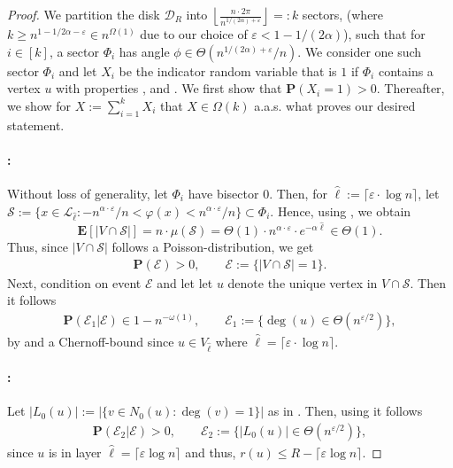 \documentclass[letterpaper,11pt]{article}
\newcommand{\E}[1]{\mathbf{E}\left[#1\right]}
\newcommand{\Prob}[1]{\mathbf{P}\left(#1\right)}
\newcommand{\eps}{\varepsilon}
\newcommand{\aas}{a.a.s.\xspace}
\newcommand{\disk}{\ensuremath{\mathcal D_R}\xspace}
\newcommand{\1}{\mathbb I}
\newcommand{\Layer}[1]{\mathcal{L}_{#1}}
\begin{document}
\begin{proof}
    We partition the disk $\disk$ into $\left\lfloor\frac{n\cdot 2\pi}{n^{1/(2\alpha) + \eps}} \right\rfloor =:  k$ sectors, (where $k \geq n^{1 - 1/2\alpha -\eps}\in n^{\Omega(1)}$ due to our choice of $\eps < 1 - 1/(2\alpha)$), such that for $i \in [k]$, a sector $\Phi_i$ has angle $\phi \in \Theta(n^{1/(2\alpha) + \eps}/n)$. We consider one such sector $\Phi_i$ and let $X_i$ be the indicator random variable that is $1$ if $\Phi_i$ contains a vertex $u$ with properties ,  and . We first show that $\Prob{X_i =1} >0$. Thereafter, we show for $X:= \sum_{i=1}^k X_i$ that $X \in \Omega(k)$ \aas what proves our desired statement.
    \paragraph{:} Without loss of generality, let $\Phi_i$ have bisector $0$. Then, for $\hat{\ell} := \lceil \eps \cdot \log n \rceil$, let $\mathcal{S} := \{x \in \Layer{\hat{\ell}}: - n^{\alpha \cdot \eps }/n < \varphi(x) < n^{\alpha \cdot \eps }/n\} \subset \Phi_i$. Hence, using , we obtain
    $$
    \E{|V\cap \mathcal{S}|} = n\cdot\mu(\mathcal{S}) = \Theta(1)\cdot n^{\alpha\cdot \eps}\cdot e^{-\alpha\hat{\ell}} \in \Theta(1).
    $$
%
    Thus, since $|V\cap \mathcal{S}|$ follows a Poisson-distribution, we get
%
    \begin{align}\label{eq:Prob-event1}
        \Prob{\mathcal{E}} >0, 
    \qquad \mathcal{E} := \{|V \cap \mathcal{S}|=1\}. 
    \end{align}
%
    Next, condition on event $\mathcal{E}$ and let let $u$ denote the unique vertex in $V\cap\mathcal S$. Then it follows
    \begin{align}\label{eq:Prob-event2}
        \Prob{\mathcal{E}_1 | \mathcal{E}} \in 1 - n^{-\omega(1)}, 
    \qquad \mathcal{E}_1 := \{\deg(u) \in \Theta(n^{\eps / 2})\},
    \end{align}
by  and a Chernoff-bound since $u \in V_{\hat{\ell}}$ where $\hat{\ell} = \lceil \eps \cdot \log n \rceil$. 

\paragraph{:} Let $|L_0(u)| := |\{v \in N_0(u) : \deg(v) = 1 \}|$ as in . Then, using  it follows
   \begin{align}\label{eq:Prob-event3}
        \Prob{\mathcal{E}_2 | \mathcal{E}} >0, 
    \qquad \mathcal{E}_2 := \{|L_0(u)| \in \Theta(n^{\eps / 2})\},
    \end{align}
since $u$ is in layer $\hat{\ell} = \lceil\eps \log n\rceil$ and thus, $r(u) \leq R - \lceil\eps \log n \rceil$.


\end{proof}
\end{document}

